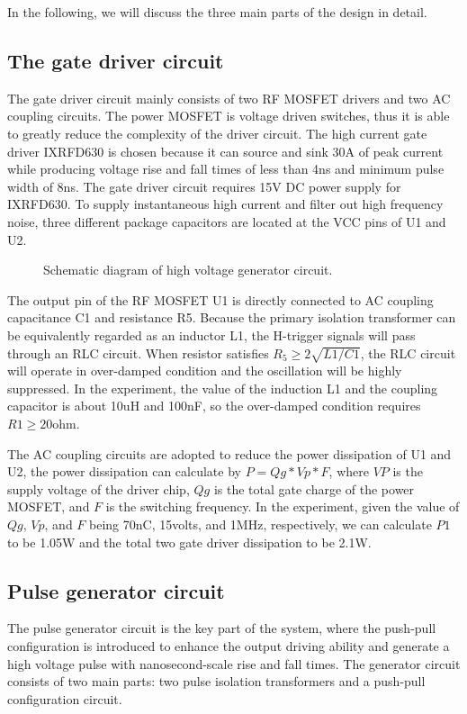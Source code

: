\documentclass[aip,rsi,reprint,graphicx]{revtex4-1} %
\begin{document}
In the following, we will discuss the three main parts of the design in detail.

\subsection{The gate driver circuit}
The gate driver circuit mainly consists of two RF MOSFET drivers and two AC coupling circuits. The power MOSFET is voltage driven switches, thus it is able to greatly reduce the complexity of the driver circuit. The high current gate driver IXRFD630 is chosen because it can source and sink 30A of peak current while producing voltage rise and fall times of less than 4ns and minimum pulse width of 8ns. The gate driver circuit requires 15V DC power supply for IXRFD630. To supply instantaneous high current and filter out high frequency noise, three different package capacitors are located at the VCC pins of U1 and U2.
\begin{figure*}
\caption{Schematic diagram of high voltage generator circuit.\label{Fig1}}%
\end{figure*}


	The output pin of the RF MOSFET U1 is directly connected to AC coupling capacitance C1 and resistance R5. Because the primary isolation transformer can be equivalently regarded as an inductor L1, the H-trigger signals will pass through an RLC circuit. When resistor satisfies $R_5\ge 2\sqrt{L1/C1}$, the RLC circuit will operate in over-damped condition and the oscillation will be highly suppressed. In the experiment, the value of the induction L1 and the coupling capacitor is about 10uH and 100nF, so the over-damped condition requires $R1\ge20$ohm.

	The AC coupling circuits are adopted to reduce the power dissipation of U1 and U2, the power dissipation can calculate by $P= Qg*Vp*F$, where $VP$ is the supply voltage of the driver chip, $Qg$ is the total gate charge of the power MOSFET, and $F$ is the switching frequency. In the experiment, given the value of $Qg$, $Vp$, and $F$ being 70nC, 15volts, and  1MHz, respectively, we can calculate $P1$ to be 1.05W and the total two gate driver dissipation to be 2.1W.

\subsection{Pulse generator circuit}
The pulse generator circuit is the key part of the system, where the push-pull configuration is introduced to enhance the output driving ability and generate a high voltage pulse with nanosecond-scale rise and fall times. 
The generator circuit consists of two main parts: two pulse isolation transformers and a push-pull configuration circuit.
\end{document}
